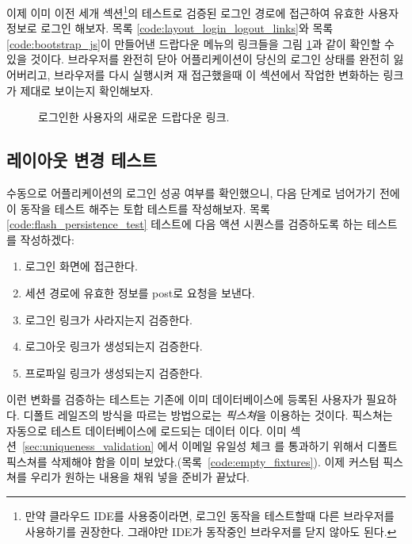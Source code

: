 이제 이미 이전 세개 섹션\footnote{만약 클라우드 IDE를 사용중이라면, 로그인 동작을 테스트할때 다른 브라우저를 사용하기를 권장한다. 그래야만 IDE가 동작중인 브라우저를 닫지 않아도 된다.}의 테스트로 검증된 로그인 경로에 접근하여 유효한 사용자 정보로 로그인 해보자. 목록 \ref{code:layout_login_logout_links}와 목록 \ref{code:bootstrap_js}이 만들어낸 드랍다운 메뉴의 링크들을 그림 \ref{fig:profile_with_logout_link}과 같이 확인할 수 있을 것이다. 브라우저를 완전히 닫아 어플리케이션이 당신의 로그인 상태를 완전히 잃어버리고, 브라우저를 다시 실행시켜 재 접근했을때 이 섹션에서 작업한 변화하는 링크가 제대로 보이는지 확인해보자. 

\begin{figure} \begin{center}  \end{center} \caption{로그인한 사용자의 새로운 드랍다운 링크.\label{fig:profile_with_logout_link}} \end{figure} 

\subsection{레이아웃 변경 테스트} \label{sec:testing_layout_changes} 

수동으로 어플리케이션의 로그인 성공 여부를 확인했으니, 다음 단계로 넘어가기 전에 이 동작을 테스트 해주는 토합 테스트를 작성해보자.  목록 \ref{code:flash_persistence_test} 테스트에 다음 액션 시퀀스를 검증하도록 하는 테스트를 작성하겠다: 

\begin{enumerate} \item 로그인 화면에 접근한다. \item 세션 경로에 유효한 정보를 post로 요청을 보낸다. \item 로그인 링크가 사라지는지 검증한다. \item 로그아웃 링크가 생성되는지 검증한다. \item 프로파일 링크가 생성되는지 검증한다. \end{enumerate} 

이런 변화를 검증하는 테스트는 기존에 이미 데이터베이스에 등록된 사용자가 필요하다. 디폴트 레일즈의 방식을 따르는 방법으로는 \emph{픽스쳐}을 이용하는 것이다. 픽스쳐는 자동으로 테스트 데이터베이스에 로드되는 데이터 이다. 이미 섹션~\ref{sec:uniqueness_validation} 에서 이메일 유일성 체크 를 통과하기 위해서 디폴트 픽스쳐를 삭제해야 함을 이미 보았다.(목록~\ref{code:empty_fixtures}). 이제 커스텀 픽스쳐를 우리가 원하는 내용을 채워 넣을 준비가 끝났다. 

